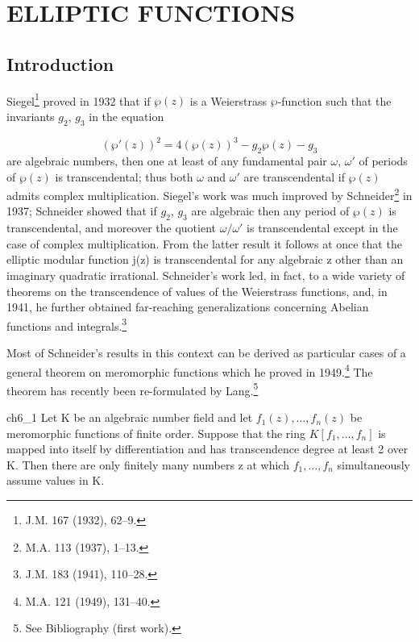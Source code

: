 
\chapter{ELLIPTIC FUNCTIONS}\label{ch:6}

\section{Introduction}

Siegel\footnote{J.M. 167 (1932), 62--9.} proved in 1932 that if  $\wp(z)$  is a Weierstrass  $\wp$-function such that the invariants  $g_2$, $g_3$ in the equation

\[(\wp'(z))^2 = 4(\wp(z))^3 - g_2\wp(z) - g_3\]
are algebraic numbers, then one at least of any fundamental pair  $\omega$, $\omega'$ of periods of $\wp(z)$ is transcendental; thus both  $\omega$ and $\omega'$ are transcendental if $\wp(z)$ admits complex multiplication. Siegel's work was much improved by Schneider\footnote{M.A. 113 (1937), 1--13.} in 1937; Schneider showed that if $g_2$, $g_3$ are algebraic then any period of $\wp(z)$ is transcendental, and moreover the quotient $\omega/\omega'$ is transcendental except in the case of complex multiplication. From the latter result it follows at once that the elliptic modular function j(z) is transcendental for any algebraic z other than an imaginary quadratic irrational. Schneider's work led, in fact, to a wide variety of theorems on the transcendence of values of the Weierstrass functions, and, in 1941, he further obtained far-reaching generalizations concerning Abelian functions and integrals.\footnote{J.M. 183 (1941), 110--28.}

Most of Schneider's results in this context can be derived as particular cases of a general theorem on meromorphic functions which he proved in 1949.\footnote{M.A. 121 (1949), 131--40.} The theorem has recently been re-formulated by Lang.\footnote{See Bibliography (first work).}

\begin{mythm}{}{ch6_1}
Let K be an algebraic number field and let  $f_1(z), \ldots, f_n(z)$ be meromorphic functions of finite order. Suppose that the ring $K[f_1, \ldots, f_n]$ is mapped into itself by differentiation and has transcendence degree at least 2 over K. Then there are only finitely many numbers z at which $f_1, \ldots, f_n$ simultaneously assume values in K.
\end{mythm}


